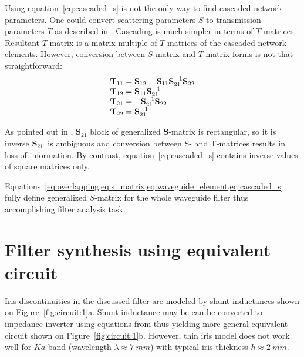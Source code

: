 \documentclass{pj}
\begin{document}
Using equation~\eqref{eq:cascaded_s} is not the only way to find
cascaded network parameters. One could convert scattering parameters
$S$ to transmission parameters $T$ as described in
\cite{frei2008}. Cascading is much simpler in terms of
$T$-matrices. Resultant $T$-matrix is a matrix multiple of
$T$-matrices of the cascaded network elements. However, conversion
between $S$-matrix and $T$-matrix forms is not that straightforward:
\begin{equation}
  \label{eq:s_to_t}
  \begin{array}{r@{}l}
    \mathbf{T}_{11} &{}= \mathbf{S}_{12} - \mathbf{S}_{11}\mathbf{S}_{21}^{-1}\mathbf{S}_{22} \\
    \mathbf{T}_{12} &{}= \mathbf{S}_{11}\mathbf{S}_{21}^{-1} \\
    \mathbf{T}_{21} &{}= -\mathbf{S}_{21}^{-1}\mathbf{S}_{22} \\
    \mathbf{T}_{22} &{}= \mathbf{S}_{21}^{-1}
  \end{array}
\end{equation}

As pointed out in \cite{frei2008}, $\mathbf{S}_{21}$ block of
generalized $\mathbf{S}$-matrix is rectangular, so it is inverse
$\mathbf{S}_{21}^{-1}$ is ambiguous and conversion between S- and
T-matrices results in loss of information. By contrast,
equation~\eqref{eq:cascaded_s} contains inverse values of square
matrices only.

Equations~\cref{eq:overlapping,eq:s_matrix,eq:waveguide_element,eq:cascaded_s}
fully define generalized $S$-matrix for the whole waveguide filter
thus accomplishing filter analysis task.

\section{Filter synthesis using equivalent circuit}
\label{sec:filter-synth}

Iris discontinuities in the discussed filter are modeled by shunt
inductances shown on Figure~\ref{fig:circuit:1}a. Shunt inductance may
be can be converted to impedance inverter using equations from
\cite{pozar2012microwave} thus yielding more general equivalent
circuit shown on Figure~\ref{fig:circuit:1}b. However, thin iris
model does not work well for $Ka$ band (wavelength
$\lambda \approx 7~mm$) with typical iris thickness $h \approx 2~mm$.
\end{document}

